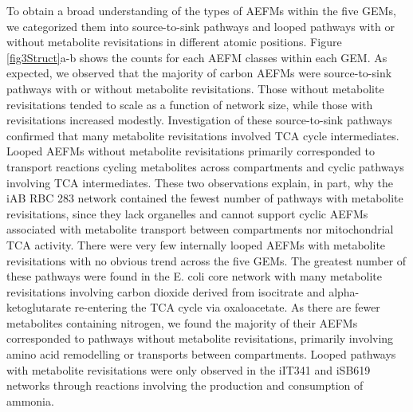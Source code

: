 \documentclass[12pt]{article}
\begin{document}
To obtain a broad understanding of the types of AEFMs within the five
GEMs, we categorized them into source-to-sink pathways and looped pathways
with or without metabolite revisitations in different atomic positions.
Figure \ref{fig3Struct}a-b shows the counts for each AEFM classes within
each GEM. As expected, we observed that the majority of carbon AEFMs were
source-to-sink pathways with or without metabolite revisitations. Those
without metabolite revisitations tended to scale as a function of network
size, while those with revisitations increased modestly. Investigation of
these source-to-sink pathways confirmed that many metabolite revisitations
involved TCA cycle intermediates. Looped AEFMs without metabolite
revisitations primarily corresponded to transport reactions cycling
metabolites across compartments and cyclic pathways involving TCA
intermediates. These two observations explain, in part, why the iAB RBC
283 network contained the fewest number of pathways with metabolite
revisitations, since they lack organelles and cannot support cyclic AEFMs
associated with metabolite transport between compartments nor
mitochondrial TCA activity. There were very few internally looped AEFMs
with metabolite revisitations with no obvious trend across the five GEMs.
The greatest number of these pathways were found in the E. coli core
network with many metabolite revisitations involving carbon dioxide
derived from isocitrate and alpha-ketoglutarate re-entering the TCA cycle
via oxaloacetate. As there are fewer metabolites containing nitrogen, we
found the majority of their AEFMs corresponded to pathways without
metabolite revisitations, primarily involving amino acid remodelling or
transports between compartments. Looped pathways with metabolite
revisitations were only observed in the iIT341 and iSB619 networks through
reactions involving the production and consumption of ammonia. 
\end{document}
